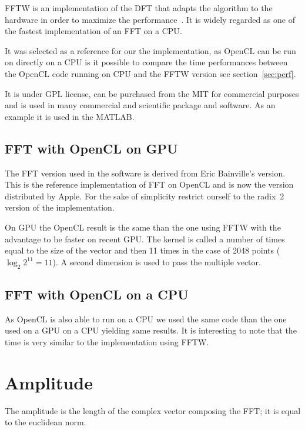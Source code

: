 \Gls{FFTW} is an implementation of the \gls{DFT} that adapts the algorithm to the hardware in order to maximize the performance~\cite{fftw05}. It is widely regarded as one of the fastest implementation of an \gls{FFT} on a \gls{CPU}.

It was selected as a reference for our the implementation, as \gls{OpenCL} can be run on directly on a \gls{CPU} is it possible to compare the time performances between the \gls{OpenCL} code running on \gls{CPU} and the \gls{FFTW} version see section~\ref{sec:perf}.

It is under GPL license, can be purchased from the \gls{MIT} for commercial purposes and is used in many commercial and scientific package and software. As an example it is used in the MATLAB.

\subsection{FFT with OpenCL on GPU}

The \gls{FFT} version used in the software is derived from Eric Bainville's version. This is the reference implementation of \gls{FFT} on \gls{OpenCL} and is now the version distributed by Apple\cite{bainville11}. For the sake of simplicity restrict ourself to the radix~2 version of the implementation.

On \gls{GPU} the \gls{OpenCL} result is the same than the one using \gls{FFTW} with the advantage to be faster on recent \gls{GPU}. The kernel is called a number of times equal to the size of the vector and then 11 times in the case of 2048 points ($\log_{2}{2^{11}} = 11$). A second dimension is used to pass the multiple vector.

\subsection{FFT with OpenCL on a CPU}

As \gls{OpenCL} is also able to run on a \gls{CPU} we used the same code than the one used on a \gls{GPU} on a \gls{CPU} yielding same results. It is interesting to note that the time is very similar to the implementation using \gls{FFTW}.

\section{Amplitude}
\label{sec:amplitude}

The amplitude is the length of the complex vector composing the \gls{FFT}; it is equal to the euclidean norm. 

